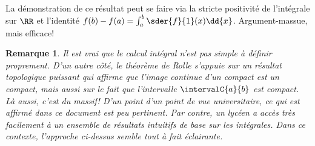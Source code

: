 \documentclass[12pt]{amsart}
\newtheorem*{remark*}{Remarque}
\begin{document}
La démonstration de ce résultat peut se faire via la stricte positivité de l'intégrale sur $\RR$ et l'identité $f(b) - f(a) = \int_a^b \sder{f}{1}(x) \dd{x}$. Argument-massue, mais efficace!


\begin{remark*}
	Il est vrai que le calcul intégral n'est pas simple à définir proprement.
	D'un autre côté, le théorème de Rolle s'appuie sur un résultat topologique puissant qui affirme que l'image continue d'un compact est un compact, mais aussi sur le fait que l'intervalle $\intervalC{a}{b}$ est compact. Là aussi, c'est du massif!
	D'un point d'un point de vue universitaire, ce qui est affirmé dans ce document est peu pertinent.
	Par contre, un lycéen a accès très facilement à un ensemble de résultats intuitifs de base sur les intégrales. Dans ce contexte, l'approche ci-dessus semble tout à fait éclairante.
\end{remark*}
\end{document}
